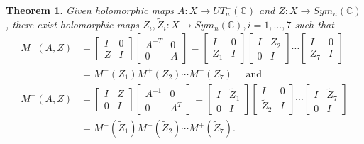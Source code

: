 \documentclass[10pt]{amsart}
\newtheorem{theo}{Theorem}[section]
\theoremstyle{remark}
\begin{document}
\begin{theo}\label{fact-ele}
    Given holomorphic maps $A: X \to UT^+_n(\mathbb{C})$ and $Z: X \to Sym_n(\mathbb{C})$, there exist holomorphic maps $Z_i, \tilde{Z}_i : X \to Sym_n(\mathbb{C}), i = 1, \dots, 7$ such that
    \begin{align*}
        M^-(A, Z) &= 
        \begin{bmatrix} I & 0 \\ Z & I   \end{bmatrix}
        \begin{bmatrix} A^{-T} & 0 \\ 0 & A  \end{bmatrix}
        =
        \begin{bmatrix} I & 0 \\ Z_1 & I   \end{bmatrix}
        \begin{bmatrix} I & Z_2 \\ 0 & I   \end{bmatrix}
        \cdots 
        \begin{bmatrix} I & 0 \\ Z_7 & I   \end{bmatrix} \\
        &=
        M^-(Z_1) M^+(Z_2) \cdots M^-(Z_7)
        \quad  \text{ and } \\
        M^+(A, Z) &= 
        \begin{bmatrix} I & Z \\ 0 & I   \end{bmatrix}
        \begin{bmatrix} A^{-1} & 0 \\ 0 & A^{T}  \end{bmatrix}
        =
        \begin{bmatrix} I & \tilde{Z}_1 \\ 0 & I   \end{bmatrix}
        \begin{bmatrix} I & 0 \\ \tilde{Z}_2 & I   \end{bmatrix}
        \cdots 
        \begin{bmatrix} I & \tilde{Z}_7 \\ 0 & I   \end{bmatrix} \\
        &=
        M^+(\tilde{Z}_1) M^-(\tilde{Z}_2) \cdots M^+(\tilde{Z}_7).
    \end{align*}
\end{theo}
\end{document}
